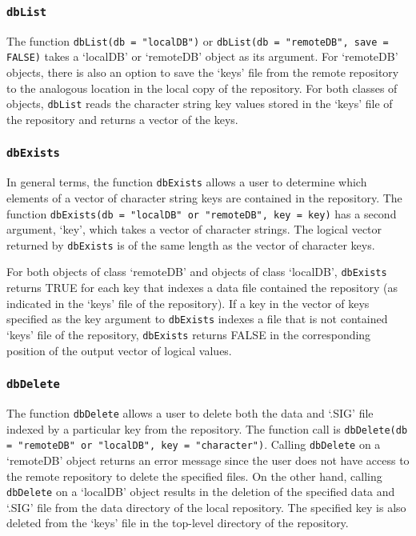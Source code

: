 \documentclass{article}
\newcommand{\code}{\texttt}
\begin{document}
\subsubsection{\code{dbList}}

The function \code{dbList(db = "localDB")} or 
\code{dbList(db = "remoteDB", save = FALSE)} takes a `localDB' 
or `remoteDB' object as its argument. For `remoteDB' objects, 
there is also an option to save the `keys' file from the remote repository
to the analogous location in the local copy of the repository. For both 
classes of objects, \code{dbList} reads the character string key values 
stored in the `keys' file of the repository and returns a vector of the 
keys.

\subsubsection{\code{dbExists}}

In general terms, the function \code{dbExists} allows a user to determine which 
elements of a vector of character string keys are contained in the 
repository. The function \code{dbExists(db = "localDB" or 
"remoteDB", key = key)} has a second argument, `key', which takes
a vector of character strings. The logical vector returned by \code{dbExists}
is of the same length as the vector of character keys.

For both objects of class `remoteDB' and objects of class `localDB', 
\code{dbExists} returns TRUE for each key that indexes a data file contained 
the repository (as indicated in the `keys' file of the repository).
If a key in the vector of keys specified as the key argument to \code{dbExists}
indexes a file that is not contained `keys' file of the repository,
\code{dbExists} returns FALSE in the corresponding position of the output vector
of logical values.


\subsubsection{\code{dbDelete}}

The function \code{dbDelete} allows a user to delete both the data and `.SIG' file
indexed by a particular key from the repository. The function call is 
\code{dbDelete(db = "remoteDB" or "localDB", key = "character")}. 
Calling \code{dbDelete} on a `remoteDB' object returns an error message 
since the user does not have access to the remote repository to delete the 
specified files. On the other hand, calling \code{dbDelete} on a `localDB' 
object results in the deletion of the specified data and `.SIG' file from 
the data directory of the local repository. The specified key is also 
deleted from the `keys' file in the top-level directory of the repository.  
\end{document}
